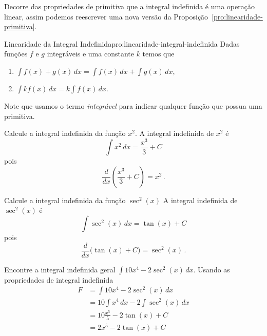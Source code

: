 Decorre das propriedades de primitiva que a integral indefinida
é uma operação linear, assim podemos reescrever uma nova versão da
Proposição~\ref{pro:linearidade-primitiva}.

\begin{proposicao}{Linearidade da Integral Indefinida}{pro:linearidade-integral-indefinida}
  Dadas funções $f$ e $g$ integráveis e uma constante $k$ temos que
  \begin{enumerate}[parsep=11pt]
  \item \(\int f(x) + g(x) \,dx = \int f(x) \,dx + \int g(x) \,dx\),
  \item \(\int k f(x) \,dx = k \int f(x) \,dx\).
  \end{enumerate}
\end{proposicao}

Note que usamos o termo \emph{integrável} para
indicar qualquer função que possua uma primitiva.

\begin{example}
  Calcule a integral indefinida da função \(x^2\).
  \solution
    A integral indefinida de \(x^2\) é
    \[
      \int x^2 \,dx = \frac{x^3}{3} + C
    \]
    pois
    \[
      \frac{d}{dx} \left( \frac{x^3}{3}+C \right) = x^2 \,.
    \]
\end{example}

\begin{example}
  Calcule a integral indefinida da função \(\sec^2(x)\)
  \solution
    A integral indefinida de \(\sec^2(x)\) é
    \[
      \int \sec^2(x) \,dx = \tan(x)+C
    \]
    pois
    \[
      \frac{d}{dx} \big( \tan(x)+C \big) = \sec^2(x) \,.
    \]
\end{example}

\begin{example}
  Encontre a integral indefinida geral \(\int 10x^4 -2\sec^2(x) \,dx\).
  \solution
  Usando as propriedades de integral indefinida
  \begin{align*}
    F
    & = \int 10x^4 - 2\sec^2(x) \,dx \\[2mm]
    & = 10 \int x^4 \,dx - 2 \int \sec^2(x) \,dx \\[2mm]
    & = 10 \frac{x^5}{5} - 2\tan(x) + C \\[2mm]
    & = 2x^5 - 2\tan(x) + C
  \end{align*}
\end{example}

